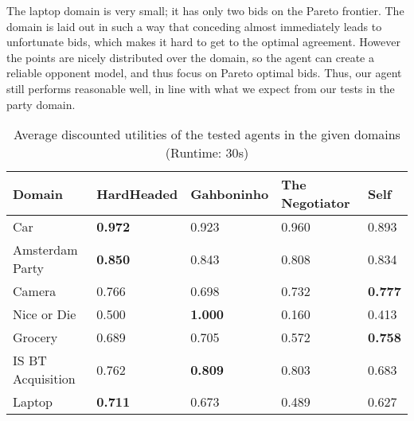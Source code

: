 The laptop domain is very small; it has only two bids on the Pareto frontier. The domain is laid out in such a way that conceding almost immediately leads to unfortunate bids, which makes it hard to get to the optimal agreement. However the points are nicely distributed over the domain, so the agent can create a reliable opponent model, and thus focus on Pareto optimal bids. Thus, our agent still performs reasonable well, in line with what we expect from our tests in the party domain.

\begin{table}[H]
  \centering
  \small
  \begin{tabular}{lp{2.5cm}p{2.5cm}p{2.5cm}p{2.5cm}}
  \toprule
  Domain                    & HardHeaded     & Gahboninho     & The Negotiator & Self \\ 
  \midrule
  Car                       & \textbf{0.972} & 0.923          & 0.960          & 0.893 \\
  Amsterdam Party           & \textbf{0.850} & 0.843          & 0.808          & 0.834 \\ 
  Camera                    & 0.766          & 0.698          & 0.732          & \textbf{0.777} \\ 
  Nice or Die               & 0.500          & \textbf{1.000} & 0.160          & 0.413 \\ 
  Grocery                   & 0.689          & 0.705          & 0.572          & \textbf{0.758} \\ 
  IS BT Acquisition         & 0.762          & \textbf{0.809} & 0.803          & 0.683 \\ 
  Laptop                    & \textbf{0.711} & 0.673          & 0.489          & 0.627 \\ 
  \bottomrule
  \end{tabular}
  \caption{Average discounted utilities of the tested agents in the given domains (Runtime: $30$s) \label{table:anac2011-domains2}}
\end{table}

